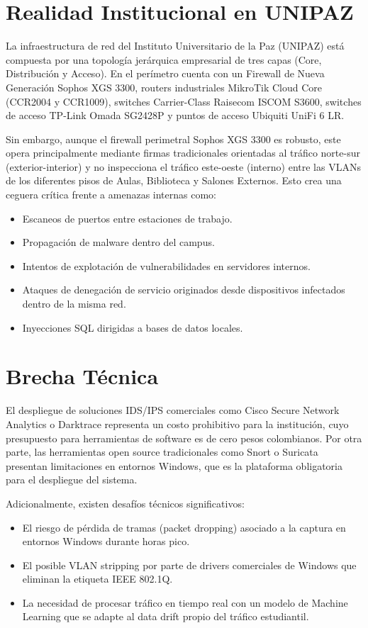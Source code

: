 \documentclass[12pt,letterpaper]{report}
\begin{document}
\section{Realidad Institucional en UNIPAZ}

La infraestructura de red del Instituto Universitario de la Paz (UNIPAZ) está compuesta por una topología jerárquica empresarial de tres capas (Core, Distribución y Acceso). En el perímetro cuenta con un Firewall de Nueva Generación Sophos XGS 3300, routers industriales MikroTik Cloud Core (CCR2004 y CCR1009), switches Carrier-Class Raisecom ISCOM S3600, switches de acceso TP-Link Omada SG2428P y puntos de acceso Ubiquiti UniFi 6 LR.

Sin embargo, aunque el firewall perimetral Sophos XGS 3300 es robusto, este opera principalmente mediante firmas tradicionales orientadas al tráfico norte-sur (exterior-interior) y no inspecciona el tráfico este-oeste (interno) entre las VLANs de los diferentes pisos de Aulas, Biblioteca y Salones Externos. Esto crea una ceguera crítica frente a amenazas internas como:

\begin{itemize}
  \item Escaneos de puertos entre estaciones de trabajo.
  \item Propagación de malware dentro del campus.
  \item Intentos de explotación de vulnerabilidades en servidores internos.
  \item Ataques de denegación de servicio originados desde dispositivos infectados dentro de la misma red.
  \item Inyecciones SQL dirigidas a bases de datos locales.
\end{itemize}

\section{Brecha Técnica}

El despliegue de soluciones IDS/IPS comerciales como Cisco Secure Network Analytics o Darktrace representa un costo prohibitivo para la institución, cuyo presupuesto para herramientas de software es de cero pesos colombianos. Por otra parte, las herramientas open source tradicionales como Snort o Suricata presentan limitaciones en entornos Windows, que es la plataforma obligatoria para el despliegue del sistema.

Adicionalmente, existen desafíos técnicos significativos:
\begin{itemize}
  \item El riesgo de pérdida de tramas (packet dropping) asociado a la captura en entornos Windows durante horas pico.
  \item El posible VLAN stripping por parte de drivers comerciales de Windows que eliminan la etiqueta IEEE 802.1Q.
  \item La necesidad de procesar tráfico en tiempo real con un modelo de Machine Learning que se adapte al data drift propio del tráfico estudiantil.
\end{itemize}
\end{document}
